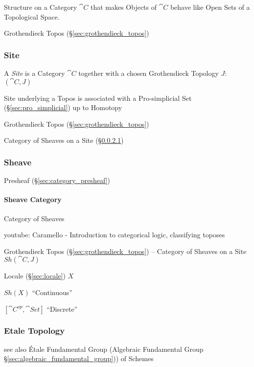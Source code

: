 Structure on a Category $\cat{C}$ that makes Objects of
$\cat{C}$ behave like Open Sets of a Topological Space.

Grothendieck Topos (\S\ref{sec:grothendieck_topos})



\subsubsection{Site}\label{sec:site}

A \emph{Site} is a Category $\cat{C}$ together with a chosen
Grothendieck Topology $J$: $(\cat{C},J)$

Site underlying a Topos is associated with a Pro-simplicial Set
(\S\ref{sec:pro_simplicial}) up to Homotopy

Grothendieck Topos (\S\ref{sec:grothendieck_topos})

Category of Sheaves on a Site (\S\ref{sec:sheave_category})



\subsubsection{Sheave}\label{sec:sheave}

Presheaf (\S\ref{sec:category_presheaf})



\paragraph{Sheave Category}\label{sec:sheave_category}\hfill

Category of Sheaves

youtube: Caramello - Introduction to categorical logic, classifying
toposes

Grothendieck Topos (\S\ref{sec:grothendieck_topos}) -- Category of
Sheaves on a Site $Sh(\cat{C},J)$

Locale (\S\ref{sec:locale}) $X$

$Sh(X)$ ``Continuous''

$[\cat{C}^{op},\cat{Set}]$ ``Discrete''





\subsubsection{Etale Topology}\label{sec:etale_topology}

see also \'Etale Fundamental Group (Algebraic Fundamental Group
\S\ref{sec:algebraic_fundamental_group})) of Schemes



